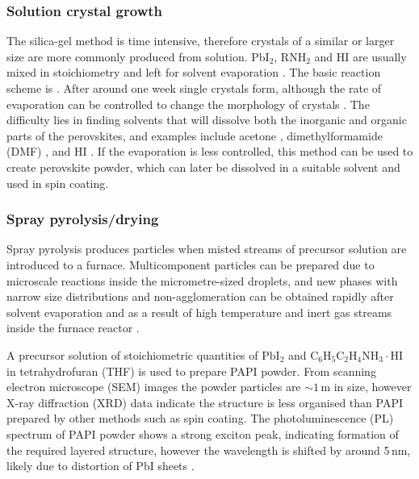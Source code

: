 \subsubsection{Solution crystal growth}
\label{sec:solutiongrowth}
The silica-gel method is time intensive, therefore crystals of a similar or larger size are more commonly produced from solution. Pb$\textrm{I}_2$, R$\textrm{NH}_2$ and HI are usually mixed in stoichiometry and left for solvent evaporation \cite{Kitazawa1996, Tang2001, Ishihara1994}. The basic reaction scheme is . After around one week single crystals form, although the rate of evaporation can be controlled to change the morphology of crystals \cite{Cheng2010}. The difficulty lies in finding solvents that will dissolve both the inorganic and organic parts of the perovskites, and examples include acetone \cite{Hong1992}, dimethylformamide (DMF) \cite{Kitazawa1996}, and HI \cite{Barman2003}. If the evaporation is less controlled, this method can be used to create perovskite powder, which can later be dissolved in a suitable solvent and used in spin coating.

\subsubsection {Spray pyrolysis/drying}
Spray pyrolysis produces particles when misted streams of precursor solution are introduced to a furnace. Multicomponent particles can be prepared due to microscale reactions inside the micrometre-sized droplets, and new phases with narrow size distributions and non-agglomeration can be obtained rapidly after solvent evaporation and as a result of high temperature and inert gas streams inside the furnace reactor \cite{Cheng2005}. 

A precursor solution of stoichiometric quantities of $\textrm{PbI}_2$ and $\textrm{C}_6\textrm{H}_5\textrm{C}_2\textrm{H}_4\textrm{NH}_3\cdot\textrm{HI}$ in tetrahydrofuran (THF) is used to prepare PAPI powder. From scanning electron microscope (SEM) images the powder particles are $\sim 1\,$\textmu m in size, however X-ray diffraction (XRD) data indicate the structure is less organised than PAPI prepared by other methods such as spin coating. The photoluminescence (PL) spectrum of PAPI powder shows a strong exciton peak, indicating formation of the required layered structure, however the wavelength is shifted by around 5\,nm, likely due to distortion of PbI sheets \cite{Cheng2005}.

